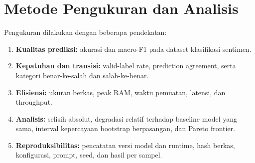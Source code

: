 \section{Metode Pengukuran dan Analisis}

Pengukuran dilakukan dengan beberapa pendekatan:

\begin{enumerate}
    \item \textbf{Kualitas prediksi:} akurasi dan macro-F1 pada dataset klasifikasi sentimen.
    \item \textbf{Kepatuhan dan transisi:} valid-label rate, prediction agreement, serta kategori benar-ke-salah dan salah-ke-benar.
    \item \textbf{Efisiensi:} ukuran berkas, peak RAM, waktu pemuatan, latensi, dan throughput.
    \item \textbf{Analisis:} selisih absolut, degradasi relatif terhadap baseline model yang sama, interval kepercayaan bootstrap berpasangan, dan Pareto frontier.
    \item \textbf{Reproduksibilitas:} pencatatan versi model dan runtime, hash berkas, konfigurasi, prompt, seed, dan hasil per sampel.
\end{enumerate}
